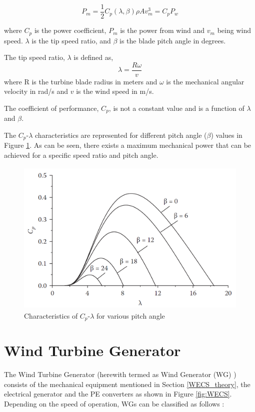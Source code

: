 \begin{equation}\label{windenergy}
    P_m =\frac{1}{2} C_p(\lambda,\beta) \rho A v_m^3 = C_p P_w
\end{equation}

where $C_p$ is the power coefficient, $P_m$ is the power from wind and $v_m$ being wind speed. $\lambda$ is the tip speed ratio, and $\beta$ is the blade pitch angle in degrees. 

The tip speed ratio, $\lambda$ is defined as,
\begin{equation}
\lambda= \frac{R\omega}{v} 
\end{equation}
where R is the turbine blade radius in meters and $\omega$ is the mechanical angular velocity in rad/s and $v$ is the wind speed in m/s.    

The coefficient of performance, $C_p$, is not a constant value and is a function of $\lambda$ and $\beta$.

The $C_p$-$\lambda$ characteristics are represented for different pitch angle ($\beta$) values in Figure \ref{fig:pitchangle}. As can be seen, there exists a maximum mechanical power that can be achieved for a specific speed ratio and pitch angle.

\begin{figure}[H]
\centering
    \includegraphics[height = 7.5cm,width = 11.5cm]{Diagrams/Chapter_2/pitchangle_1.png}
    \caption{Characteristics of $C_p$-$\lambda$ for various pitch angle \cite{ali_wind_2012}}
    \label{fig:pitchangle}
\end{figure}

\section{Wind Turbine Generator}
The Wind Turbine Generator (herewith termed as Wind Generator (\gls{WG}) ) consists of the mechanical equipment mentioned in Section \ref{WECS_theory}, the electrical generator and the \gls{PE} converters as shown in Figure \ref{fig:WECS}. Depending on the speed of operation, \gls{WG}s can be classified as follows \cite{ali_wind_2012}:

